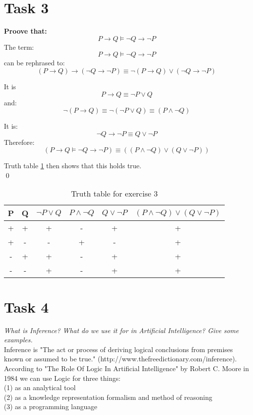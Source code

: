 \documentclass[paper=a4, fontsize=11pt]{scrartcl} %
\numberwithin{equation}{section} %
\numberwithin{figure}{section} %
\numberwithin{table}{section} %
\begin{document}
\section{Task 3}
\textbf{Proove that:}\\
\[P\to Q \vDash\neg Q\to\neg P\]
The term: \[P\to Q \vDash\neg Q\to\neg P\]
can be rephrased to:
\[(P\to Q) \to(\neg Q\to\neg P)\equiv \neg (P\to Q) \lor(\neg Q\to\neg P)\]

It is \[P\to Q\equiv \neg P\lor Q \]
and:
\[\neg (P\to Q)\equiv \neg (\neg P\lor Q)\equiv (P\land\neg Q)\]

It is:
\[\neg Q\to \neg P\equiv Q\lor\neg P\]\vspace{5mm}
Therefore:
\[(P\to Q \vDash\neg Q\to\neg P) \equiv ((P\land\neg Q)\lor (Q\lor\neg P))\]

Truth table \ref{tab:ex3} then shows that this holds true.\\\qed

\begin{table}[h]
\begin{tabular}{|c|c|c|c|c|c|}
\hline
P&Q&$\neg P\lor Q$&$P\land\neg Q$&$Q\lor\neg P$&$(P\land\neg Q)\lor (Q\lor\neg P)$\\
\hline
+&+&+&-&+&+\\
+&-&-&+&-&+\\
-&+&+&-&+&+\\
-&-&+&-&+&+\\
\hline
\end{tabular}
\caption{Truth table for exercise 3}
\label{tab:ex3}
\end{table}

\section{Task 4}
\textit{What is Inference? What do we use it for in Artificial Intelligence? Give some examples.}\\

Inference is "The act or process of deriving logical conclusions from premises known or assumed to be true." (http://www.thefreedictionary.com/inference).\\

According to "The Role Of Logic In Artificial Intelligence" by Robert C. Moore in 1984 we can use Logic for three things:\\
(1) as an analytical tool\\
(2) as a knowledge representation formalism and method of reasoning\\
(3) as a programming language\\
\end{document}
